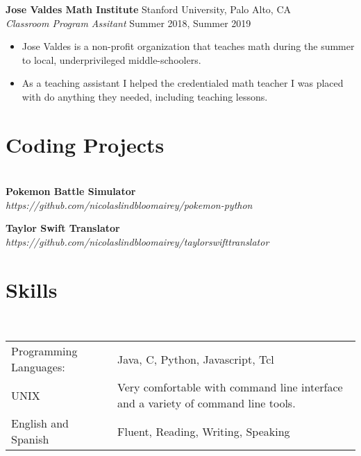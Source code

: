 \documentclass[10pt,letterpaper]{article}
\begin{document}
\noindent
\textbf{Jose Valdes Math Institute} \hfill Stanford University, Palo Alto, CA\\
\textit{Classroom Program Assitant} \hfill Summer 2018, Summer 2019\\
\vspace*{-10pt} \begin{itemize} \itemsep -1mm
    \item Jose Valdes is a non-profit organization that teaches math during the
    summer to local, underprivileged middle-schoolers.
    \item As a teaching assistant I helped the credentialed math teacher I was
    placed with do anything they needed, including teaching lessons.
\end{itemize}


\section*{Coding Projects} \vspace*{-12pt} \hrulefill \vspace*{6pt} \\
\textbf{Pokemon Battle Simulator} \hfill \textit{https://github.com/nicolaslindbloomairey/pokemon-python}\\
\vspace*{-10pt}

\noindent
\textbf{Taylor Swift Translator} \hfill \textit{https://github.com/nicolaslindbloomairey/taylorswifttranslator}\\
\vspace*{-10pt}

\section*{Skills} \vspace*{-12pt} \hrulefill \vspace*{6pt} \\
\begin{tabular}{ l l }
Programming Languages: & Java, C, Python, Javascript, Tcl\\
UNIX & Very comfortable with command line interface and a variety of command
line tools.\\
English and Spanish & Fluent, Reading, Writing, Speaking\\
\end{tabular}
\end{document}
